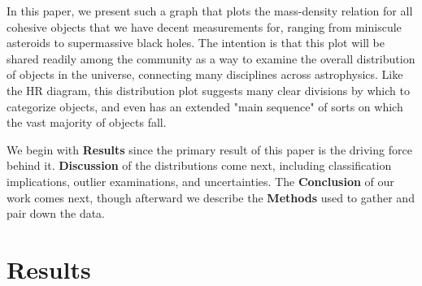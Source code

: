 \documentclass[twocolumn,linenumbers]{aastex631}
\begin{document}
In this paper, we present such a graph that plots the mass-density relation for all cohesive objects that we have decent measurements for, ranging from miniscule asteroids to supermassive black holes. The intention is that this plot will be shared readily among the community as a way to examine the overall distribution of objects in the universe, connecting many disciplines across astrophysics. Like the HR diagram, this distribution plot suggests many clear divisions by which to categorize objects, and even has an extended "main sequence" of sorts on which the vast majority of objects fall. 

We begin with \textbf{Results} since the primary result of this paper is the driving force behind it. \textbf{Discussion} of the distributions come next, including classification implications, outlier examinations, and uncertainties. The \textbf{Conclusion} of our work comes next, though afterward we describe the \textbf{Methods} used to gather and pair down the data. 

\section{Results} \label{sec:intro}
\end{document}
